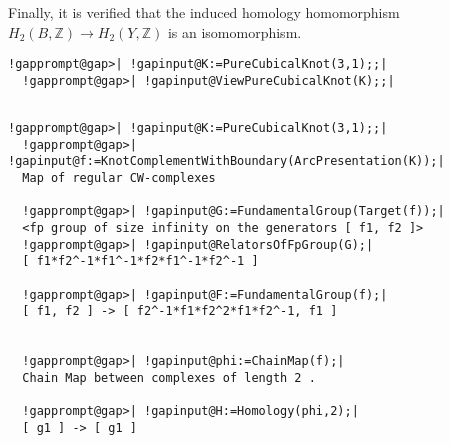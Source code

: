 \documentclass[a4paper,11pt]{report}
\begin{document}
{{ Finally, it is verified that the induced homology homomorphism $H_2(B,\mathbb Z) \rightarrow H_2(Y,\mathbb Z)$ is an isomomorphism. 
\begin{Verbatim}[commandchars=!@|,fontsize=\small,frame=single,label=Example]
  !gapprompt@gap>| !gapinput@K:=PureCubicalKnot(3,1);;|
  !gapprompt@gap>| !gapinput@ViewPureCubicalKnot(K);;|
  
\end{Verbatim}
  
\begin{Verbatim}[commandchars=!@|,fontsize=\small,frame=single,label=Example]
  !gapprompt@gap>| !gapinput@K:=PureCubicalKnot(3,1);;|
  !gapprompt@gap>| !gapinput@f:=KnotComplementWithBoundary(ArcPresentation(K));|
  Map of regular CW-complexes
  
  !gapprompt@gap>| !gapinput@G:=FundamentalGroup(Target(f));|
  <fp group of size infinity on the generators [ f1, f2 ]>
  !gapprompt@gap>| !gapinput@RelatorsOfFpGroup(G);|
  [ f1*f2^-1*f1^-1*f2*f1^-1*f2^-1 ]
  
  !gapprompt@gap>| !gapinput@F:=FundamentalGroup(f);|
  [ f1, f2 ] -> [ f2^-1*f1*f2^2*f1*f2^-1, f1 ]
  
  
  !gapprompt@gap>| !gapinput@phi:=ChainMap(f);|
  Chain Map between complexes of length 2 . 
  
  !gapprompt@gap>| !gapinput@H:=Homology(phi,2);|
  [ g1 ] -> [ g1 ]
  
  
\end{Verbatim}
 }

 }

 
\end{document}
